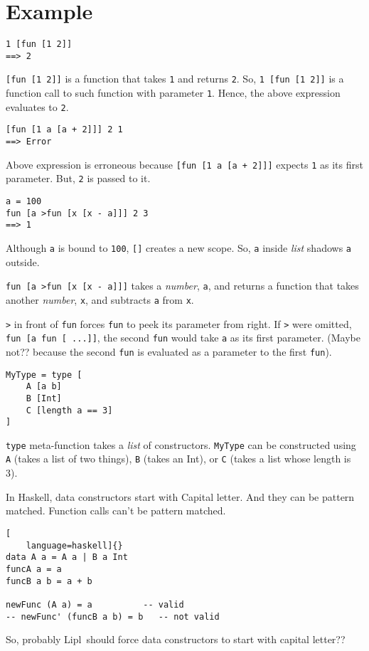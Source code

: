 \documentclass[12pt,letterpaper,notitlepage]{article}
\newcommand{\lipl}{Lipl}
\begin{document}
\section{Example}

\begin{lstlisting}
1 [fun [1 2]]
==> 2
\end{lstlisting}

\verb![fun [1 2]]! is a function that takes \verb!1! and returns \verb!2!.
So, \verb!1 [fun [1 2]]! is a function call to such function with parameter
\verb!1!. Hence, the above expression evaluates to \verb!2!.

\begin{lstlisting}
[fun [1 a [a + 2]]] 2 1
==> Error
\end{lstlisting}

Above expression is erroneous because \verb![fun [1 a [a + 2]]]! expects
\verb!1! as its first parameter. But, \verb!2! is passed to it.

\begin{lstlisting}
a = 100
fun [a >fun [x [x - a]]] 2 3
==> 1
\end{lstlisting}

Although \verb!a! is bound to \verb!100!, \verb![]! creates a new scope.
So, \verb!a! inside \emph{list} shadows \verb!a! outside.

\verb!fun [a >fun [x [x - a]]]! takes a \emph{number}, \verb!a!,
and returns a function that takes another \emph{number}, \verb!x!,
and subtracts \verb!a! from \verb!x!.

\verb!>! in front of \verb!fun! forces \verb!fun! to peek its parameter
from right. If \verb!>! were omitted,
\verb!fun [a fun [ ...]]!, the second \verb!fun! would take \verb!a!
as its first parameter.
(Maybe not?? because the second \verb!fun! is evaluated as a parameter
to the first \verb!fun!).

\begin{lstlisting}
MyType = type [
    A [a b]
    B [Int]
    C [length a == 3]
]
\end{lstlisting}

\verb!type! meta-function takes a \emph{list} of constructors.
\verb!MyType! can be constructed using
\verb!A! (takes a list of two things), \verb!B! (takes an Int),
or \verb!C! (takes a list whose length is 3).

In Haskell, data constructors start with Capital letter.
And they can be pattern matched.
Function calls can't be pattern matched.

\begin{lstlisting}[
    language=haskell]{}
data A a = A a | B a Int
funcA a = a
funcB a b = a + b

newFunc (A a) = a          -- valid
-- newFunc' (funcB a b) = b   -- not valid
\end{lstlisting}

So, probably \lipl\ should force data constructors to start with capital letter??
\end{document}
